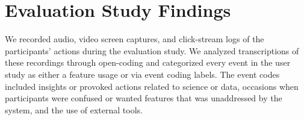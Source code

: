 \section{Evaluation Study Findings\label{sec:eval_findings}}
We recorded audio, video screen captures, and click-stream logs of the participants' actions during the evaluation study. We analyzed transcriptions of these recordings through open-coding and categorized every event in the user study as either a feature usage or via event coding labels. The event codes included insights or provoked actions related to science or data, occasions when participants were confused or wanted features that was unaddressed by the system, and the use of external tools.
